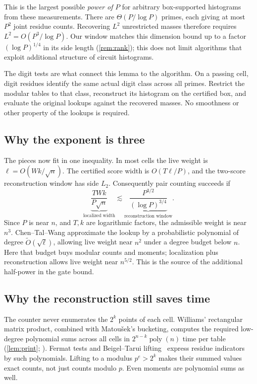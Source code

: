 \documentclass[11pt,letterpaper]{article}
\theoremstyle{definition}
\theoremstyle{remark}
\begin{document}
This is the largest possible \emph{power of \(P\)} for arbitrary
box-supported histograms from these measurements. There are
\(\Theta(P/\log P)\) primes, each giving at most \(P^2\) joint
residue counts. Recovering \(L^2\) unrestricted masses therefore
requires \(L^2=O(P^3/\log P)\). Our window matches this dimension
bound up to a factor \((\log P)^{1/4}\) in its side length
(\cref{rem:rank}); this does not limit algorithms that exploit
additional structure of circuit histograms.

The digit tests are what connect this lemma to the algorithm.
On a passing cell, digit residues identify the same actual digit
class across all primes. Restrict the modular tables to that class,
reconstruct its histogram on the certified box, and evaluate the
original lookups against the recovered masses. No smoothness or
other property of the lookups is required.

\subsection{Why the exponent is three}\label{sec:overview-exponent}

The pieces now fit in one inequality. In most cells the live weight
is \(\ell=O(Wk/\sqrt n)\). The certified score width is
\(O(T\ell/P)\), and the two-score reconstruction window has side
\(L_2\). Consequently pair counting succeeds if
\[
 \underbrace{\frac{TWk}{P\sqrt n}}_{\text{localized width}}
 \lesssim
 \underbrace{\frac{P^{3/2}}{(\log P)^{3/4}}}_{\text{reconstruction window}}.
\]
Since \(P\) is near \(n\), and \(T,k\) are logarithmic factors,
the admissible weight is near \(n^3\). Chen--Tal--Wang approximate
the lookup by a probabilistic polynomial of degree
\(\widetilde O(\sqrt\ell)\), allowing live weight near \(n^2\)
under a degree budget below \(n\). Here that budget buys modular
counts and moments; localization plus reconstruction allows live
weight near \(n^{5/2}\). This is the source of the additional
half-power in the gate bound.

\subsection{Why the reconstruction still saves time}\label{sec:overview-cost}

The counter never enumerates the \(2^k\) points of each cell.
Williams' rectangular matrix product, combined with Matou\v{s}ek's
bucketing, computes the required low-degree polynomial sums across
all cells in \(2^{n-k}\operatorname{poly}(n)\) time per table
(\cref{lem:print}; \cite{WilACC14,Mat91}). Fermat tests and
Beigel--Tarui lifting~\cite{BT94} express residue indicators by
such polynomials. Lifting to a modulus \(p^e>2^k\) makes their
summed values exact counts, not just counts modulo \(p\).
Even moments are polynomial sums as well.
\end{document}
